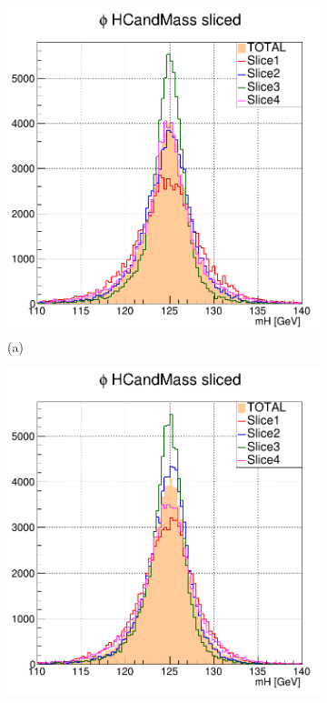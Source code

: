 \begin{figure}[!ht]
    \captionsetup[subfigure]{labelformat=empty}
    \vspace*{-0.2cm}
    \centering
    \setlength{\mylength}{\textwidth}
    \begin{subfigure}[t]{0.50\mylength}
        \centering
        \includegraphics[width=0.45\mylength]{resources/plots/Phi3_fit_SGN_MH_sliced.png}
        \caption{\footnotesize (a)}
    \end{subfigure}%
    \begin{subfigure}[t]{0.50\mylength}
        \centering
        \includegraphics[width=0.45\mylength]{resources/plots/Omega_fit_SGN_MH_sliced.png}

\end{subfigure}
\end{figure}
